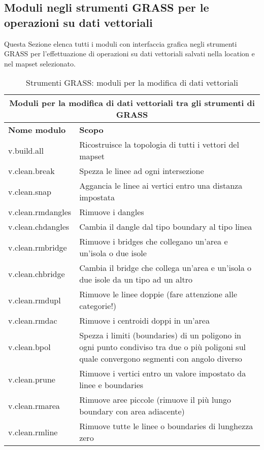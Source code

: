 \clearpage

\subsection{Moduli negli strumenti GRASS per le operazioni su dati vettoriali}

Questa Sezione elenca tutti i moduli con interfaccia grafica negli strumenti GRASS per l'effettuazione di operazioni su dati vettoriali salvati nella location e nel mapset selezionato.

\begin{table}[ht]
\centering
\caption{Strumenti GRASS: moduli per la modifica di dati vettoriali}\medskip
 \begin{tabular}{|p{4cm}|p{12cm}|}
  \hline \multicolumn{2}{|c|}{\textbf{Moduli per la modifica di dati vettoriali tra gli strumenti di GRASS}} \\
  \hline \textbf{Nome modulo} & \textbf{Scopo} \\
  \hline v.build.all & Ricostruisce la topologia di tutti i vettori del mapset \\
  \hline v.clean.break & Spezza le linee ad ogni intersezione \\
  \hline v.clean.snap & Aggancia le linee ai vertici entro una distanza impostata \\
  \hline v.clean.rmdangles & Rimuove i dangles \\
  \hline v.clean.chdangles & Cambia il dangle dal tipo boundary al tipo linea \\
  \hline v.clean.rmbridge & Rimuove i bridges che collegano un'area e un'isola o due isole \\
  \hline v.clean.chbridge & Cambia il bridge che collega un'area e un'isola o due isole da un tipo ad un altro \\
  \hline v.clean.rmdupl & Rimuove le linee doppie (fare attenzione alle categorie!) \\
  \hline v.clean.rmdac & Rimuove i centroidi doppi in un'area \\
  \hline v.clean.bpol & Spezza i limiti (boundaries) di un poligono in ogni punto condiviso tra due o più poligoni sul quale convergono segmenti con angolo diverso \\
  \hline v.clean.prune & Rimuove i vertici entro un valore impostato da linee e boundaries \\
  \hline v.clean.rmarea & Rimuove aree piccole (rimuove il più lungo boundary con area adiacente) \\
  \hline v.clean.rmline & Rimuove tutte le linee o boundaries di lunghezza zero \\

\end{tabular}
\end{table}
